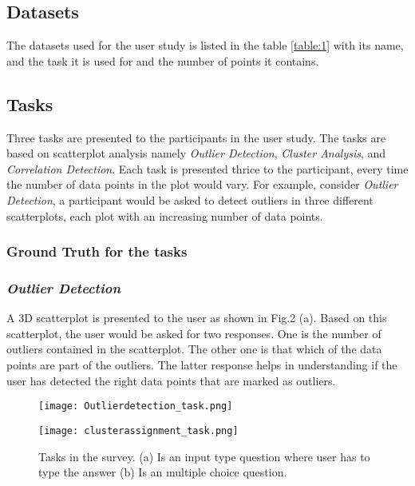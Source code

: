\documentclass[journal]{vgtc}                %
\begin{document}
\subsection{Datasets}

The datasets used for the user study is listed  in the table \ref{table:1} with its name, and the task it is used for and the number of points it contains.


\subsection{Tasks}

Three tasks are presented to the participants in the user study. The tasks are based on scatterplot analysis namely \textit{Outlier Detection}, \textit{Cluster Analysis}, and \textit{Correlation Detection}. Each task is presented thrice to the participant, every time the number of data points in the plot would vary. For example, consider \textit{Outlier Detection}, a participant would be asked to detect outliers in three different scatterplots, each plot with an increasing number of data points.

\subsubsection{Ground Truth for the tasks}

\subsubsection{\textit{Outlier Detection}}
A 3D scatterplot is presented to the user as shown in Fig.2 (a). Based on this scatterplot, the user would be asked for two responses. One is the number of outliers contained in the scatterplot. The other one is that which of the data points are part of the outliers. The latter response helps in understanding if the user has detected the right data points that are marked as outliers. 

\begin{figure}[ht]
    \begin{minipage}[b]{0.45\linewidth}
        \centering
        \texttt{[image: Outlierdetection\_task.png]}
    \end{minipage}
    \hspace{0.5cm}
    \begin{minipage}[b]{0.45\linewidth}
        \centering
        \texttt{[image: clusterassignment\_task.png]}
    \end{minipage}
    \caption{Tasks in the survey. (a) Is an input type question where user has to type the answer (b) Is an multiple choice question.}
\end{figure}
\end{document}
